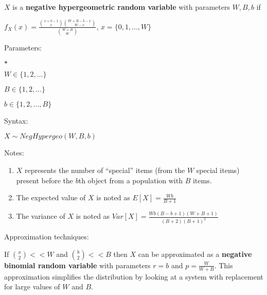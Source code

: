 \documentclass{article}
\begin{document}
 $X$ is a \textbf{negative hypergeometric random variable} with parameters \textbf{$W, B, b$} if

$f_X(x) = \frac{ { x+b-1 \choose x} {W+B-b-x \choose W-x} }{ {W+B \choose W} }$, $x=\{0,1,...,W\}$

Parameters:

\begin{list}{$\star$ }{}
\item $W \in \{1,2,...\}$
\item $B \in \{1,2,...\}$
\item $b \in \{1,2,...,B\}$
\end{list}

Syntax:

$X\sim NegHypergeo(W,B,b)$

Notes:

\begin{enumerate}
\item $X$ represents the number of ``special'' items (from the $W$ special items) present before the $b$th object from a population with $B$ items.
\item The expected value of $X$ is noted as $E[X] = \frac{Wb}{B+1}$
\item The variance of $X$ is noted as $Var[X] = \frac{Wb(B-b+1)(W+B+1)}{(B+2)(B+1)^2}$
\end{enumerate}

Approximation techniques:

If ${x \choose 2} << W$ and ${b \choose 2} << B$ then $X$ can be approximated as a \textbf{negative binomial random variable} with parameters $r = b$ and $p = \frac{W}{W+B}$.
This approximation simplifies the distribution by looking at a system with replacement for large values of $W$ and $B$.
\end{document}
